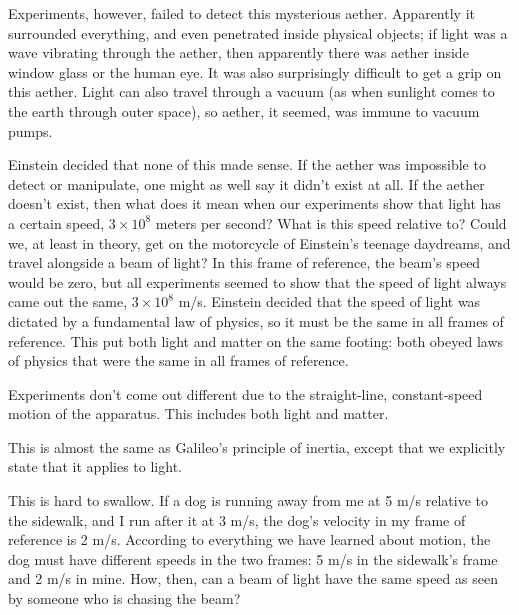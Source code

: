 Experiments, however, failed to detect this mysterious aether. Apparently
it surrounded everything, and even penetrated inside physical objects; if light was
a wave vibrating through the aether, then apparently there was aether inside window
glass or the human eye. It was also surprisingly difficult to get a grip on this
aether. Light can also travel through a vacuum (as when sunlight comes to the
earth through outer space), so aether,
it seemed, was immune to vacuum pumps.

Einstein decided that none of this made sense. If the aether was impossible to
detect or manipulate, one might as well say it didn't exist at all. If the aether
doesn't exist, then what does it mean when our experiments show that light has
a certain speed, $3\times10^8$ meters per second? What is this speed relative to?
Could we, at least in theory, get on the motorcycle of Einstein's teenage daydreams,
and travel alongside a beam of light? In this frame of reference, the beam's speed
would be zero, but all experiments seemed to show that
the speed of light always came out the same, $3\times10^8$ m/s. Einstein decided
that the speed of light was dictated by a fundamental law of physics, so it must
be the same in all frames of reference. This put both light and matter on the same
footing: both obeyed laws of physics that were the same in all frames of reference.
\begin{important}
Experiments don't come out different due to the straight-line,
constant-speed motion of the apparatus. This includes both light and
matter.
\end{important}
\noindent This is almost the same as Galileo's principle of inertia, except that we
explicitly state that it applies to light.

This is hard to swallow. If a dog is running away from me at
5 m/s relative to the sidewalk, and I run after it at 3 m/s,
the dog's velocity in my frame of reference is 2 m/s.
According to everything we have learned about motion, the
dog must have different speeds in the two frames: 5 m/s in
the sidewalk's frame and 2 m/s in mine. How, then, can a
beam of light have the same speed as seen by someone who is
chasing the beam?

